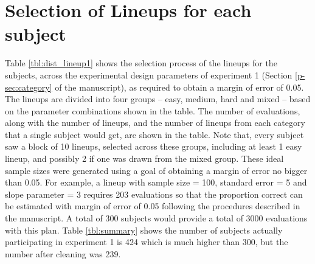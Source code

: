 \documentclass[12pt]{article}
\begin{document}
\section{Selection of Lineups for each subject} \label{sec:lineup_selection}
Table \ref{tbl:dist_lineup1} shows the selection process of the lineups for the subjects, across the experimental design parameters of experiment 1 (Section \ref{p-sec:category} of the manuscript), as required to obtain a margin of error of 0.05. The lineups are divided into four groups -- easy, medium, hard and mixed -- based on the parameter combinations shown in the table. The number of evaluations, along with the number of lineups, and the number of lineups from each category that a single subject would get, are shown in the table. Note that, every subject saw a block of 10 lineups, selected across these groups, including at least 1 easy lineup, and possibly 2 if one was drawn from the mixed group. These ideal sample sizes were generated using a goal of obtaining a margin of error no bigger than 0.05. For example,  a lineup with sample size = 100, standard error  = 5 and slope parameter = 3 requires 203 evaluations so that the proportion correct can be estimated with margin of error of 0.05 following the procedures described in the manuscript.  A total of 300 subjects would provide a total of 3000 evaluations with this plan.  Table \ref{tbl:summary} shows the number of subjects actually participating in experiment 1 is 424 which is much higher than 300, but the number after cleaning was 239.    
\end{document}
